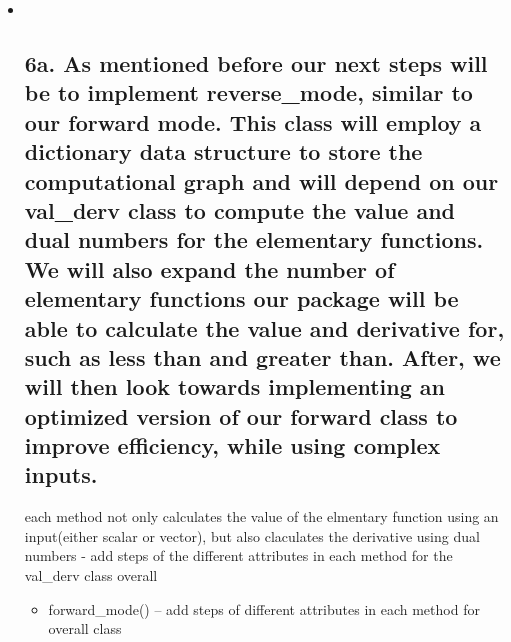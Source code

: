 \documentclass[11pt]{article}
\providecommand{\tightlist}{%
      \setlength{\itemsep}{0pt}\setlength{\parskip}{0pt}}
\begin{document}
\begin{itemize}
\item ~
  \hypertarget{a.-as-mentioned-before-our-next-steps-will-be-to-implement-reverse_mode-similar-to-our-forward-mode.-this-class-will-employ-a-dictionary-data-structure-to-store-the-computational-graph-and-will-depend-on-our-val_derv-class-to-compute-the-value-and-dual-numbers-for-the-elementary-functions.-we-will-also-expand-the-number-of-elementary-functions-our-package-will-be-able-to-calculate-the-value-and-derivative-for-such-as-less-than-and-greater-than.-after-we-will-then-look-towards-implementing-an-optimized-version-of-our-forward-class-to-improve-efficiency-while-using-complex-inputs.}{%
  \subsection{6a. As mentioned before our next steps will be to
  implement reverse\_mode, similar to our forward mode. This class will
  employ a dictionary data structure to store the computational graph
  and will depend on our val\_derv class to compute the value and dual
  numbers for the elementary functions. We will also expand the number
  of elementary functions our package will be able to calculate the
  value and derivative for, such as less than and greater than. After,
  we will then look towards implementing an optimized version of our
  forward class to improve efficiency, while using complex
  inputs.}\label{a.-as-mentioned-before-our-next-steps-will-be-to-implement-reverse_mode-similar-to-our-forward-mode.-this-class-will-employ-a-dictionary-data-structure-to-store-the-computational-graph-and-will-depend-on-our-val_derv-class-to-compute-the-value-and-dual-numbers-for-the-elementary-functions.-we-will-also-expand-the-number-of-elementary-functions-our-package-will-be-able-to-calculate-the-value-and-derivative-for-such-as-less-than-and-greater-than.-after-we-will-then-look-towards-implementing-an-optimized-version-of-our-forward-class-to-improve-efficiency-while-using-complex-inputs.}}

  each method not only calculates the value of the elmentary function
  using an input(either scalar or vector), but also claculates the
  derivative using dual numbers - add steps of the different attributes
  in each method for the val\_derv class overall

  \begin{itemize}
  \tightlist
  \item
    forward\_mode() -- add steps of different attributes in each method
    for overall class
  \end{itemize}
\end{itemize}
\end{document}
